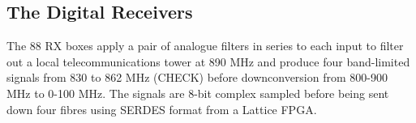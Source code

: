 \subsection{The Digital Receivers}
The 88 RX boxes apply a pair of analogue filters in series to each input to filter out a local telecommunications tower at 890 MHz and produce four band-limited signals from 830 to 862 MHz (CHECK) before downconversion from 800-900 MHz to 0-100 MHz. The signals are 8-bit complex sampled before being sent down four fibres using SERDES format from a Lattice FPGA.
